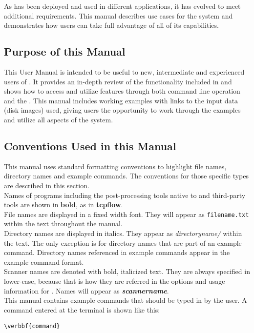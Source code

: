\documentclass[11pt]{article} %
\begin{document}
As \bulk has been deployed and used in different applications, it has evolved to meet additional requirements. This manual describes use cases for the \bulk system and demonstrates how users can take full advantage of all of its capabilities.

\subsection{Purpose of this Manual}
This User Manual is intended to be useful to new, intermediate and experienced users of \bulk. It provides an in-depth review of the functionality included in \bulk and shows how to access and utilize features through both command line operation and the \viewer. This manual includes working examples with links to the input data (disk images)  used, giving users the opportunity to work through the examples and utilize all aspects of the system. 

\subsection{Conventions Used in this Manual}
This manual uses standard formatting conventions to highlight file names, directory names and example commands. The conventions for those specific types are described in this section. \\

Names of programs including the post-processing tools native to \bulk and third-party tools are shown in \textbf{bold}, as in \textbf{tcpflow}.\\

File names are displayed in a fixed width font. They will appear as \texttt{filename.txt} within the text throughout the manual.\\

Directory names are displayed in italics. They appear as \textit{directoryname/} within the text. The only exception is for directory names that are part of an example command. Directory names referenced in example commands appear in the example command format.\\

Scanner names are denoted with bold, italicized text. They are always specified in lower-case, because that is how they are referred in the options and usage information for \bulk. Names will appear as \textbf{\textit{scannername}}.\\

This manual contains example commands that should be typed in by the user. A command entered at the terminal is shown like this: \begin{Verbatim}[commandchars=\\\{\}]
\verbbf{command}
\end{Verbatim}
\end{document}
